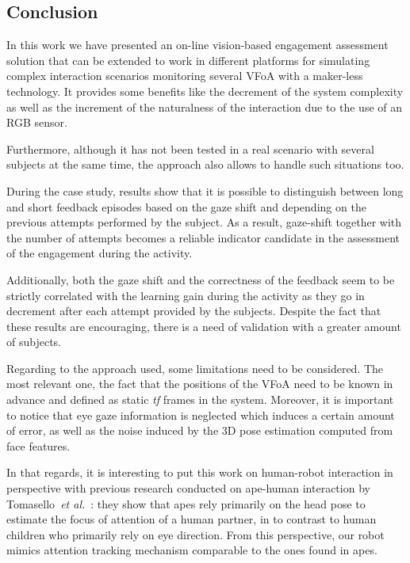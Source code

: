 \documentclass{sig-alternate}
\newcommand{\etal}{\textit{et al.}\xspace}
\begin{document}

\subsection{Conclusion}

In this work we have presented an on-line vision-based engagement assessment
solution that can be extended to work in different platforms for simulating
complex interaction scenarios monitoring several VFoA with a maker-less
technology. It provides some benefits like the decrement of the system
complexity as well as the increment of the naturalness of the interaction due to
the use of an RGB sensor.  

Furthermore, although it has not been tested in a real scenario with several
subjects at the same time, the approach also allows to handle such situations
too.

During the case study, results show that it is possible to distinguish between
long and short feedback episodes based on the gaze shift and depending on the
previous attempts performed by the subject. As a result, gaze-shift together
with the number of attempts becomes a reliable indicator candidate in the
assessment of the engagement during the activity.

Additionally, both the gaze shift and the correctness of the feedback seem to be
strictly correlated with the learning gain during the activity as they go in
decrement after each attempt provided by the subjects. Despite the fact that
these results are encouraging, there is a need of validation with a greater
amount of subjects.

Regarding to the approach used, some limitations need to be considered. The most
relevant one, the fact that the positions of the VFoA need to be known in
advance and defined as static \textit{tf} frames in the system. Moreover, it is
important to notice that eye gaze information is neglected which induces a
certain amount of error, as well as the noise induced by the 3D pose estimation
computed from face features.

In that regards, it is interesting to put this work on human-robot interaction
in perspective with previous research conducted on ape-human interaction by
Tomasello~\etal~\cite{tomasello2007reliance}: they show that apes rely primarily
on the head pose to estimate the focus of attention of a human partner, in to contrast
to human children who primarily rely on eye direction. From this perspective,
our robot mimics attention tracking mechanism comparable to the ones found in apes.
\end{document}
